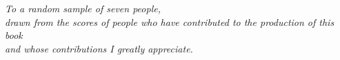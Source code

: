 \cleardoublepage
\thispagestyle{empty}
\begin{center}
\Large\itshape
To a random sample of seven people,\\ 
drawn from the scores of people who have contributed to the production of this book\\
and whose contributions I greatly appreciate.
\end{center}

